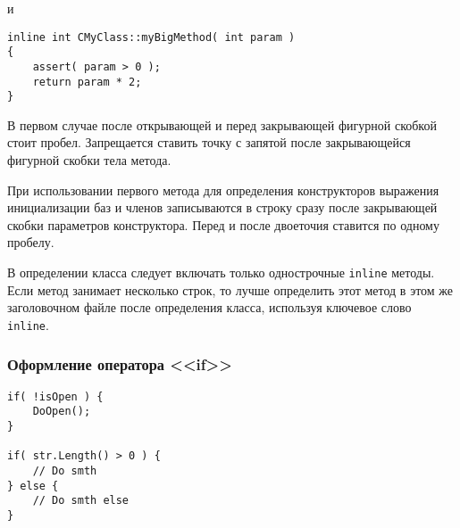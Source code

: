 и

\begin{lstlisting}[frame=single]
inline int CMyClass::myBigMethod( int param )
{
    assert( param > 0 );
    return param * 2;
}
\end{lstlisting}

В первом случае после открывающей и перед закрывающей фигурной скобкой стоит пробел. Запрещается ставить точку с запятой после закрывающейся фигурной скобки тела метода.

При использовании первого метода для определения конструкторов выражения инициализации баз и членов  записываются в строку сразу после закрывающей скобки параметров конструктора. Перед и после двоеточия ставится по одному пробелу.

В определении класса следует включать только однострочные \lstinline|inline| методы. Если метод занимает несколько строк, то лучше определить этот метод в этом же заголовочном файле после определения класса, используя ключевое слово \lstinline|inline|.

\newpage
\subsubsection{Оформление оператора <<if>>}

\begin{lstlisting}[frame=single]
if( !isOpen ) {
    DoOpen();
}

if( str.Length() > 0 ) {
    // Do smth
} else {
    // Do smth else
}
\end{lstlisting}

